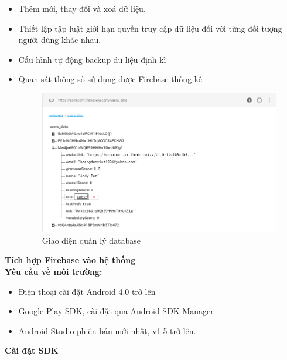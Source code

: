 \begin{itemize}
\begin{itemize}
			\item Thêm mới, thay đổi và xoá dữ liệu.
			\item Thiết lập tập luật giới hạn quyền truy cập dữ liệu đối với từng đối tượng người dùng khác nhau.
			\item Cấu hình tự động backup dữ liệu định kì
			\item Quan sát thông số sử dụng được Firebase thống kê\\ \begin{figure}[H]
  \begin{center}
	\includegraphics[scale=0.45]{firebase_database}
    \caption{Giao diện quản lý database}
    \label{FirebaseDatabase}
  \end{center}
\end{figure}
	\end{itemize}
\end{itemize}

{\Large \textbf{Tích hợp Firebase vào hệ thống }}\\

\textbf{Yêu cầu về môi trường:}
\begin{itemize}
	\item Điện thoại cài đặt Android 4.0 trở lên
	\item Google Play SDK, cài đặt qua Android SDK Manager
	\item Android Studio phiên bản mới nhất, v1.5 trở lên.\\ 
\end{itemize}
\pagebreak

\textbf{Cài đặt SDK}

